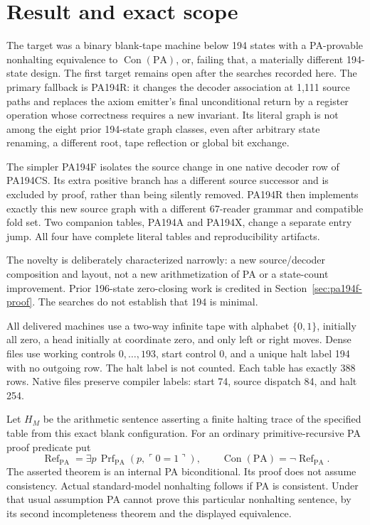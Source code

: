 \documentclass[11pt,letterpaper]{article}
\newcommand{\PA}{\mathrm{PA}}
\newcommand{\Con}{\operatorname{Con}}
\begin{document}
\section{Result and exact scope}

The target was a binary blank-tape machine below 194 states with a
PA-provable nonhalting equivalence to $\Con(\PA)$, or, failing that,
a materially different 194-state design. The first target remains open
after the searches recorded here. The primary fallback is PA194R:
it changes the decoder association at 1,111 source paths and replaces
the axiom emitter's final unconditional return by a register operation
whose correctness requires a new invariant. Its literal graph is not
among the eight prior 194-state graph classes, even after arbitrary
state renaming, a different root, tape reflection or global bit exchange.

The simpler PA194F isolates the source change in one native decoder row
of PA194CS. Its extra positive branch has a different source successor
and is excluded by proof, rather than being silently removed. PA194R
then implements exactly this new source graph with a different
67-reader grammar and compatible fold set. Two companion tables,
PA194A and PA194X, change a separate entry jump. All four have complete
literal tables and reproducibility artifacts.

The novelty is deliberately characterized narrowly: a new source/decoder
composition and layout, not a new arithmetization of PA or a state-count
improvement. Prior 196-state zero-closing work is credited in
Section~\ref{sec:pa194f-proof}. The searches do not establish that 194
is minimal.

All delivered machines use a two-way infinite tape with alphabet
$\{0,1\}$, initially all zero, a head initially at coordinate zero, and
only left or right moves. Dense files use working controls
$0,\ldots,193$, start control 0, and a unique halt label 194 with no
outgoing row. The halt label is not counted. Each table has exactly
388 rows. Native files preserve compiler labels: start 74,
source dispatch 84, and halt 254.

Let $H_M$ be the arithmetic sentence asserting a finite halting trace
of the specified table from this exact blank configuration.
For an ordinary primitive-recursive PA proof predicate put
\[
 \operatorname{Ref}_{\PA}
 =\exists p\,\operatorname{Prf}_{\PA}
     (p,\ulcorner0=1\urcorner),
 \qquad \Con(\PA)=\neg\operatorname{Ref}_{\PA}.
\]
The asserted theorem is an internal PA biconditional. Its proof does
not assume consistency. Actual standard-model nonhalting follows if
PA is consistent. Under that usual assumption PA cannot prove this
particular nonhalting sentence, by its second incompleteness theorem
and the displayed equivalence.
\end{document}
